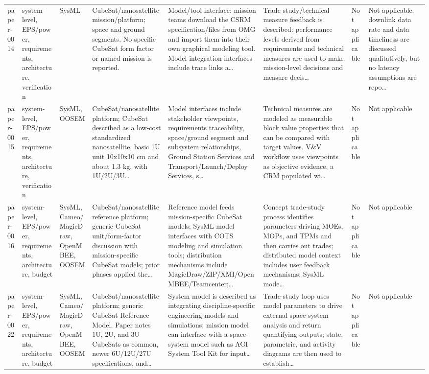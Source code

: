 \documentclass[10pt]{article}
\begin{document}
\begin{landscape}
\begin{longtable}{p{1.1cm}p{3.1cm}p{2.5cm}p{3.3cm}p{4.0cm}p{3.5cm}p{2.8cm}p{2.8cm}}
paper-0014 & system-level, EPS/power, requirements, architecture, verification & SysML & CubeSat/nanosatellite mission/platform; space and ground segments. No specific CubeSat form factor or named mission is reported. & Model/tool interface: mission teams download the CSRM specification/files from OMG and import them into their own graphical modeling tool. Model integration interfaces include trace links a… & Trade-study/technical-measure feedback is described: performance levels derived from requirements and technical measures are used to make mission-level decisions and measure decis… & Not applicable & Not applicable; downlink data rate and data timeliness are discussed qualitatively, but no latency assumptions are repo… \\
paper-0015 & system-level, EPS/power, requirements, architecture, verification & SysML, OOSEM & CubeSat/nanosatellite platform; CubeSat described as a low-cost standardized nanosatellite, basic 1U unit 10x10x10 cm and about 1.3 kg, with 1U/2U/3U… & Model interfaces include stakeholder viewpoints, requirements traceability, space/ground segment and subsystem relationships, Ground Station Services and Transport/Launch/Deploy Services, s… & Technical measures are modeled as measurable block value properties that can be compared with target values. V\&V workflow uses viewpoints as objective evidence, a CRM populated wi… & Not applicable & Not applicable \\
paper-0016 & system-level, EPS/power, requirements, architecture, budget & SysML, Cameo/MagicDraw, OpenMBEE, OOSEM & CubeSat/nanosatellite reference platform; generic CubeSat unit/form-factor discussion with mission-specific CubeSat models; prior phases applied the… & Reference model feeds mission-specific CubeSat models; SysML model interfaces with COTS modeling and simulation tools; distribution mechanisms include MagicDraw/ZIP/XMI/OpenMBEE/Teamcenter;… & Concept trade-study process identifies parameters driving MOEs, MOPs, and TPMs and then carries out trades; distributed model context includes user feedback mechanisms; SysML mode… & Not applicable & Not applicable \\
paper-0022 & system-level, EPS/power, requirements, architecture, budget & SysML, Cameo/MagicDraw, OpenMBEE, OOSEM & CubeSat/nanosatellite platform; generic CubeSat Reference Model. Paper notes 1U, 2U, and 3U CubeSats as common, newer 6U/12U/27U specifications, and… & System model is described as integrating discipline-specific engineering models and simulations; mission model can interface with a space-system model such as AGI System Tool Kit for input… & Trade-study loop uses model parameters to drive external space-system analysis and return quantifying outputs; state, parametric, and activity diagrams are then used to establish… & Not applicable & Not applicable \\

\end{longtable}
\end{landscape}
\end{document}
